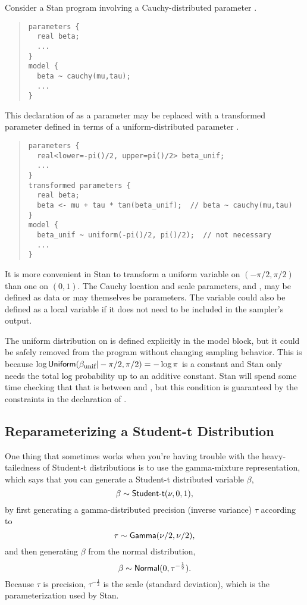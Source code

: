 Consider a Stan program involving a Cauchy-distributed parameter
.
%
\begin{quote}
\begin{Verbatim}[fontsize=\small]
parameters {
  real beta;
  ...
}
model {
  beta ~ cauchy(mu,tau);
  ...
}
\end{Verbatim}
\end{quote}
%
This declaration of  as a parameter may be replaced with a
transformed parameter  defined in terms of a
uniform-distributed parameter .
%
\begin{quote}
\begin{Verbatim}[fontsize=\small]
parameters {
  real<lower=-pi()/2, upper=pi()/2> beta_unif;
  ...
}
transformed parameters {
  real beta;
  beta <- mu + tau * tan(beta_unif);  // beta ~ cauchy(mu,tau)
}    
model {
  beta_unif ~ uniform(-pi()/2, pi()/2);  // not necessary
  ...
}
\end{Verbatim}
\end{quote}
%
It is more convenient in Stan to transform a uniform variable on
$(-\pi/2, \pi/2)$ than one on $(0,1)$.  The Cauchy location and scale
parameters,  and , may be defined as data or may
themselves be parameters.  The variable  could also be
defined as a local variable if it does not need to be included in the
sampler's output.

The uniform distribution on  is defined explicitly in
the model block, but it could be safely removed from the program
without changing sampling behavior.  This is because $\log
\mbox{\sf Uniform}(\beta_{\mbox{\footnotesize unif}}|-\pi/2,\pi/2) =
-\log \pi$ is a constant and Stan only
needs the total log probability up to an additive constant.  Stan will spend
some time checking that that  is between
 and , but this condition is guaranteed by
the constraints in the declaration of .  

\subsection{Reparameterizing a Student-t Distribution}

One thing that sometimes works when you're having trouble with the
heavy-tailedness of Student-t distributions is to use the
gamma-mixture representation, which says that you can generate a
Student-t distributed variable $\beta$,
\[
\beta \sim \mbox{\sf Student-t}(\nu, 0, 1),
\]
by first generating a gamma-distributed precision (inverse variance)
$\tau$ according to
\[
\tau \sim \mbox{\sf Gamma}(\nu/2, \nu/2),
\]
and then generating $\beta$ from the normal distribution,
\[
\beta \sim \mbox{\sf Normal}(0,\tau^{-\frac{1}{2}}).
\]
%
Because $\tau$ is precision, $\tau^{-\frac{1}{2}}$ is the scale
(standard deviation), which is the parameterization used by Stan.

